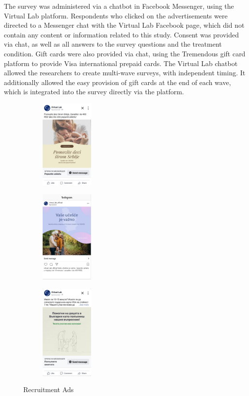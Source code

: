\documentclass{article}
\begin{document}
The survey was administered via a chatbot in Facebook Messenger, using the Virtual Lab platform. Respondents who clicked on the advertisements were directed to a Messenger chat with the Virtual Lab Facebook page, which did not contain any content or information related to this study. Consent was provided via chat, as well as all answers to the survey questions and the treatment condition. Gift cards were also provided via chat, using the Tremendous gift card platform to provide Visa international prepaid cards. The Virtual Lab chatbot allowed the researchers to create multi-wave surveys, with independent timing. It additionally allowed the easy provision of gift cards at the end of each wave, which is integrated into the survey directly via the platform.



\begin{figure}[H]
\centering
\begin{subfigure}{0.3\textwidth}
\centering
\includegraphics[width=100px]{images/recruitment/558.png}
\end{subfigure}
\begin{subfigure}{0.3\textwidth}
\centering
\includegraphics[width=100px]{images/recruitment/639.png}
\end{subfigure}
\begin{subfigure}{0.3\textwidth}
\centering
\includegraphics[width=100px]{images/recruitment/742.png}
\end{subfigure}
\caption{Recruitment Ads}
\label{fig:Recruitment Ads}
\end{figure}
\end{document}
